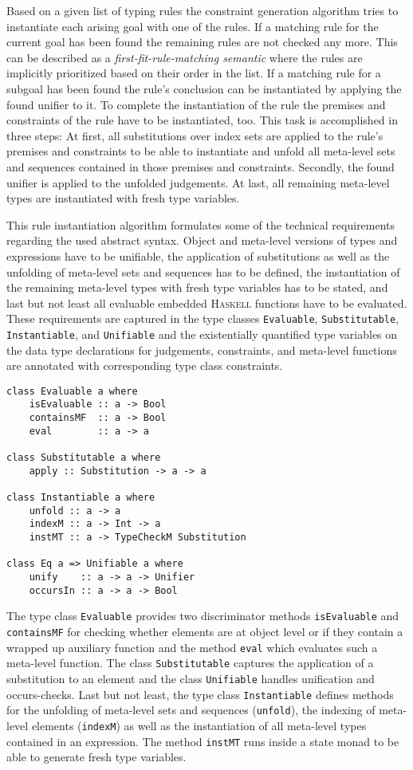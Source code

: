 Based on a given list of typing rules the constraint generation
algorithm tries to instantiate each arising goal with one of the
rules. If a matching rule for the current goal has been found the
remaining rules are not checked any more. This can be described as a
\textit{first-fit-rule-matching semantic} where the rules are
implicitly prioritized based on their order in the list. If a matching
rule for a subgoal has been found the rule's conclusion can be
instantiated by applying the found unifier to it. To complete the
instantiation of the rule the premises and constraints of the rule
have to be instantiated, too. This task is accomplished in three
steps: At first, all substitutions over index sets are applied to the
rule's premises and constraints to be able to instantiate and unfold
all meta-level sets and sequences contained in those premises and
constraints. Secondly, the found unifier is applied to the unfolded
judgements. At last, all remaining meta-level types are instantiated
with fresh type variables.

This rule instantiation algorithm formulates some of the technical
requirements regarding the used abstract syntax. Object and meta-level
versions of types and expressions have to be unifiable, the
application of substitutions as well as the unfolding of meta-level
sets and sequences has to be defined, the instantiation of the
remaining meta-level types with fresh type variables has to be
stated, and last but not least all evaluable embedded
\textsc{Haskell} functions have to be evaluated. These requirements
are captured in the type classes \texttt{Evaluable},
\texttt{Substitutable}, \texttt{Instantiable}, and \texttt{Unifiable}
and the existentially quantified type variables on the data type
declarations for judgements, constraints, and meta-level functions are
annotated with corresponding type class constraints.
\begin{lstlisting}
class Evaluable a where
    isEvaluable :: a -> Bool
    containsMF  :: a -> Bool
    eval        :: a -> a

class Substitutable a where
    apply :: Substitution -> a -> a

class Instantiable a where
    unfold :: a -> a
    indexM :: a -> Int -> a
    instMT :: a -> TypeCheckM Substitution

class Eq a => Unifiable a where
    unify    :: a -> a -> Unifier
    occursIn :: a -> a -> Bool
\end{lstlisting}
The type class \texttt{Evaluable} provides two discriminator methods
\texttt{isEvaluable} and \texttt{containsMF} for checking whether
elements are at object level or if they contain a wrapped up auxiliary
function and the method \texttt{eval} which evaluates such a
meta-level function. The class \texttt{Substitutable} captures the
application of a substitution to an element and the class
\texttt{Unifiable} handles unification and occurs-checks. Last but not
least, the type class \texttt{Instantiable} defines methods for the
unfolding of meta-level sets and sequences (\texttt{unfold}), the
indexing of meta-level elements (\texttt{indexM}) as well as the
instantiation of all meta-level types contained in an expression. The
method \texttt{instMT} runs inside a state monad to be able to
generate fresh type variables.

